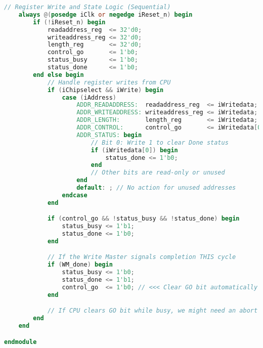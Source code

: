 \begin{lstlisting}[language=Verilog, caption={CONTROL\_SLAVE.v - Avalon Slave for Control/Status}, label=lst:verilog_controlslave]
    // Register Write and State Logic (Sequential)
    always @(posedge iClk or negedge iReset_n) begin
        if (!iReset_n) begin
            readaddress_reg  <= 32'd0;
            writeaddress_reg <= 32'd0;
            length_reg       <= 32'd0;
            control_go       <= 1'b0;
            status_busy      <= 1'b0;
            status_done      <= 1'b0;
        end else begin
            // Handle register writes from CPU
            if (iChipselect && iWrite) begin
                case (iAddress)
                    ADDR_READADDRESS:  readaddress_reg  <= iWritedata;
                    ADDR_WRITEADDRESS: writeaddress_reg <= iWritedata;
                    ADDR_LENGTH:       length_reg       <= iWritedata;
                    ADDR_CONTROL:      control_go       <= iWritedata[0]; // Latch the GO bit from CPU
                    ADDR_STATUS: begin
                        // Bit 0: Write 1 to clear Done status
                        if (iWritedata[0]) begin
                            status_done <= 1'b0;
                        end
                        // Other bits are read-only or unused
                    end
                    default: ; // No action for unused addresses
                endcase
            end

            if (control_go && !status_busy && !status_done) begin
                status_busy <= 1'b1;
                status_done <= 1'b0;
            end

            // If the Write Master signals completion THIS cycle
            if (WM_done) begin
                status_busy <= 1'b0;
                status_done <= 1'b1;
                control_go  <= 1'b0; // <<< Clear GO bit automatically on completion
            end

            // If CPU clears GO bit while busy, we might need an abort mechanism (currently ignored)
        end
    end

endmodule
\end{lstlisting}

